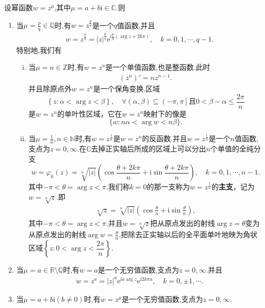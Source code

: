 \documentclass[../../main.tex]{subfiles}%
\begin{document}
\begin{corollary}
设幂函数$w=z^\mu$,其中$\mu=a+b\mathrm{i}\in \mathbb{C}$.则
\begin{enumerate}[(1)]
\item 当$\mu = \frac{p}{q}\in \mathbb{Q}$时,有$w = z^{\frac{p}{q}}$是一个$q$值函数,并且
\begin{align*}
w = z^{\frac{p}{q}} = |z|^{\frac{p}{q}} \text{e}^{\text{i}\frac{p}{q}(\arg z + 2k\pi)},\quad k=0,1,\cdots,q-1.
\end{align*}
特别地,我们有
\begin{enumerate}[(i)]
\item 当$\mu = n\in \mathbb{Z}$时,有$w=z^n$是一个单值函数,也是整函数.此时
\begin{align*}
(z^n)' =nz^{n-1}.
\end{align*}
并且除原点外$w=z^n$是一个保角变换.区域
\[
\left\{ z: \alpha < \arg z < \beta \right\},\quad \forall \left( \alpha ,\beta \right) \subseteq \left( -\pi ,\pi \right]\text{且}0 < \beta - \alpha \leqslant \frac{2\pi}{n}
\]
是$w=z^n$的单叶性区域，它在$w = z^n$映射下的像是
\[
\{ w: n\alpha < \arg w < n\beta \}.
\]

\item 当$\mu = \frac{1}{n},n\in \mathbb{N}$时,有$w=z^{ \frac{1}{n}}$是$w=z^n$的反函数.并且$w=z^{\frac{1}{n}}$是一个$n$值函数,支点为$z=0,\infty$.在$\mathbb{C}$去掉正实轴后所成的区域上可以分出$n$个单值的全纯分支
\[
w = \varphi_k(z) = \sqrt[n]{|z|} \left( \cos \frac{\theta + 2k\pi}{n} + \text{i}\sin \frac{\theta + 2k\pi}{n} \right),
\quad
k = 0,1,\cdots,n - 1.
\]
其中$-\pi < \theta =\arg z < \pi$.我们称$k = 0$的那一支称为$w=z^{ \frac{1}{n}}$的\textbf{主支}，记为$w = \sqrt[n]{z}$.即
\begin{align*}
\sqrt[n]{z}=\sqrt[n]{|z|} \left( \cos \frac{\theta}{n} + \text{i}\sin \frac{\theta}{n} \right),
\end{align*}
其中$-\pi < \theta =\arg z < \pi$.并且$w = \sqrt[n]{z}$把从原点发出的射线$\arg z = \theta$变为从原点发出的射线$\arg w = \frac{\theta}{n}$,把除去正实轴以后的全平面单叶地映为角状区域$\left\{ z: 0 < \arg z < \dfrac{2\pi}{n} \right\}$.
\end{enumerate}

\item 当$\mu = a \in \mathbb{R} \setminus \mathbb{Q}$时,有$w=a$是一个无穷值函数,支点为$z=0,\infty$.并且
\begin{align*}
w = z^a = |z|^a \text{e}^{\text{i}a\arg z} \text{e}^{\text{i}2k\pi a},\quad k=0,\pm 1,\cdots.
\end{align*}

\item 当$\mu = a +b \mathrm{i}(b\neq 0)$时,有$w=z^{\mu}$是一个无穷值函数,支点为$z=0,\infty$.
\end{enumerate}
\end{corollary}
\end{document}
